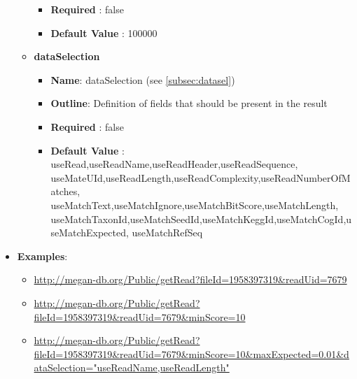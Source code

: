 \documentclass[11pt]{article}
\begin{document}
\begin{itemize}
\begin{itemize}
\begin{itemize}
					\item \textbf{Required} : false
					\item \textbf{Default Value} : 100000
				\end{itemize}
			\item \textbf{dataSelection}
				\begin{itemize}
					\item \textbf{Name}: dataSelection (see \ref{subsec:datasel})
					\item \textbf{Outline}: Definition of fields that should be present in the result
					\item \textbf{Required} : false
					\item \textbf{Default Value} : useRead,useReadName,useReadHeader,useReadSequence, useMateUId,useReadLength,useReadComplexity,useReadNumberOfMatches, useMatchText,useMatchIgnore,useMatchBitScore,useMatchLength, useMatchTaxonId,useMatchSeedId,useMatchKeggId,useMatchCogId,useMatchExpected, useMatchRefSeq
				\end{itemize}
		\end{itemize}
	\item \textbf{Examples}:
		\begin{itemize}
			\item \url{http://megan-db.org/Public/getRead?fileId=1958397319&readUid=7679}
			\item \url{http://megan-db.org/Public/getRead?fileId=1958397319&readUid=7679&minScore=10}
			\item \url{http://megan-db.org/Public/getRead?fileId=1958397319&readUid=7679&minScore=10&maxExpected=0.01&dataSelection="useReadName,useReadLength"}
		\end{itemize}
\end{itemize}
\end{document}
